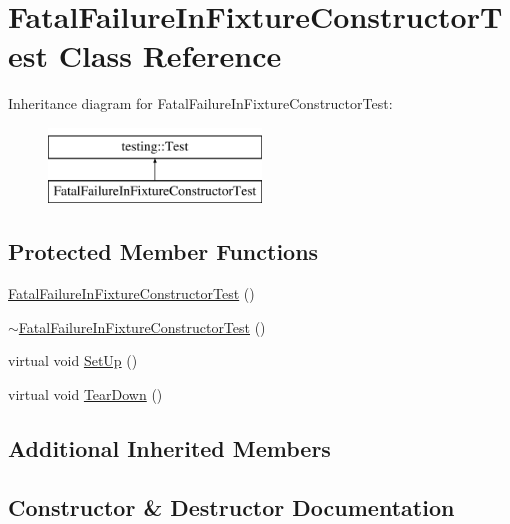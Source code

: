 \hypertarget{classFatalFailureInFixtureConstructorTest}{}\section{Fatal\+Failure\+In\+Fixture\+Constructor\+Test Class Reference}
\label{classFatalFailureInFixtureConstructorTest}
Inheritance diagram for Fatal\+Failure\+In\+Fixture\+Constructor\+Test\+:\begin{figure}[H]
\begin{center}
\leavevmode
\includegraphics[height=2.000000cm]{classFatalFailureInFixtureConstructorTest}
\end{center}
\end{figure}
\subsection*{Protected Member Functions}
\begin{DoxyCompactItemize}
\item 
\mbox{\hyperlink{classFatalFailureInFixtureConstructorTest_a1dc9a5fcf0e1f22d614990a0fe2cb504}{Fatal\+Failure\+In\+Fixture\+Constructor\+Test}} ()
\item 
\mbox{\hyperlink{classFatalFailureInFixtureConstructorTest_a514709af7159172a12193a7508683c46}{$\sim$\+Fatal\+Failure\+In\+Fixture\+Constructor\+Test}} ()
\item 
virtual void \mbox{\hyperlink{classFatalFailureInFixtureConstructorTest_a006d3ac0e7a4ad3c469c3b41dc7c42c3}{Set\+Up}} ()
\item 
virtual void \mbox{\hyperlink{classFatalFailureInFixtureConstructorTest_a2763026a557e1fce4e59bd16c4eced57}{Tear\+Down}} ()
\end{DoxyCompactItemize}
\subsection*{Additional Inherited Members}


\subsection{Constructor \& Destructor Documentation}
\mbox{\label{classFatalFailureInFixtureConstructorTest_a1dc9a5fcf0e1f22d614990a0fe2cb504}} 
